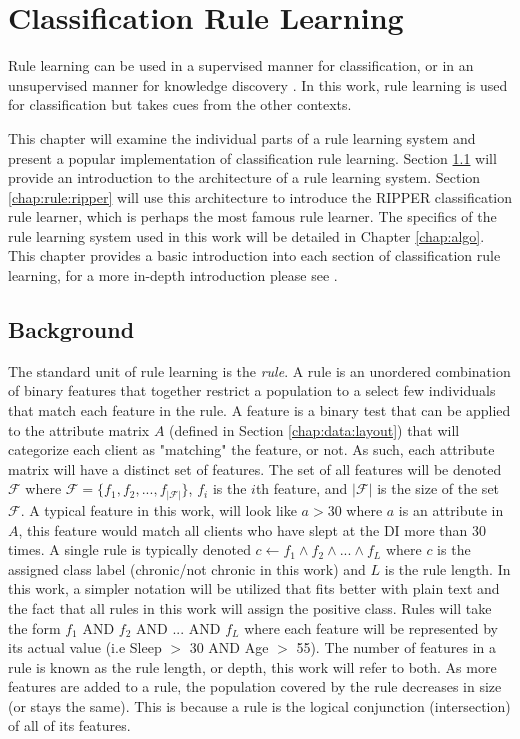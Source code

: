 \chapter{Classification Rule Learning} \label{chap:rule}

Rule learning can be used in a supervised manner for classification, or in an unsupervised manner for knowledge discovery \cite{agrawal1996fast} \cite{kavvsek2006apriori}. In this work, rule learning is used for classification but takes cues from the other contexts.

This chapter will examine the individual parts of a rule learning system and present a popular implementation of classification rule learning. Section \ref{chap:rule:back} will provide an introduction to the architecture of a rule learning system.
Section \ref{chap:rule:ripper} will use this architecture to introduce the RIPPER \cite{cohen1995ripper} classification rule learner, which is perhaps the most famous rule learner. 
The specifics of the rule learning system used in this work will be detailed in Chapter \ref{chap:algo}.
This chapter provides a basic introduction into each section of classification rule learning, for a more in-depth introduction please see \cite{furnkranz2012foundations}.


\section{Background} \label{chap:rule:back}

The standard unit of rule learning is the \emph{rule}. A rule is an unordered combination of binary features that together restrict a population to a select few individuals that match each feature in the rule. A feature is a binary test that can be applied to the attribute matrix $A$ (defined in Section \ref{chap:data:layout}) that will categorize each client as "matching" the feature, or not.
As such, each attribute matrix will have a distinct set of features.
The set of all features will be denoted $\mathcal{F}$ where $\mathcal{F} = \{ f_1, f_2, ..., f_{|\mathcal{F}|}\}$, $f_i$ is the $i$th feature, and $|\mathcal{F}|$ is the size of the set $\mathcal{F}$.
A typical feature in this work, will look like $a > 30$ where $a$ is an attribute in $A$, this feature would match all clients who have slept at the DI more than 30 times.
A single rule is typically denoted $c \leftarrow f_1 \land  f_2 \land ... \land f_L$ where $c$ is the assigned class label (chronic/not chronic in this work) and $L$ is the rule length. In this work, a simpler notation will be utilized that fits better with plain text and the fact that all rules in this work will assign the positive class. Rules will take the form $f_1$ AND $f_2$ AND $...$ AND $f_L$ where each feature will be represented by its actual value (i.e Sleep $>$ 30 AND Age $>$ 55).
The number of features in a rule is known as the rule length, or depth, this work will refer to both.
As more features are added to a rule, the population covered by the rule decreases in size (or stays the same). This is because a rule is the logical conjunction (intersection) of all of its features.

